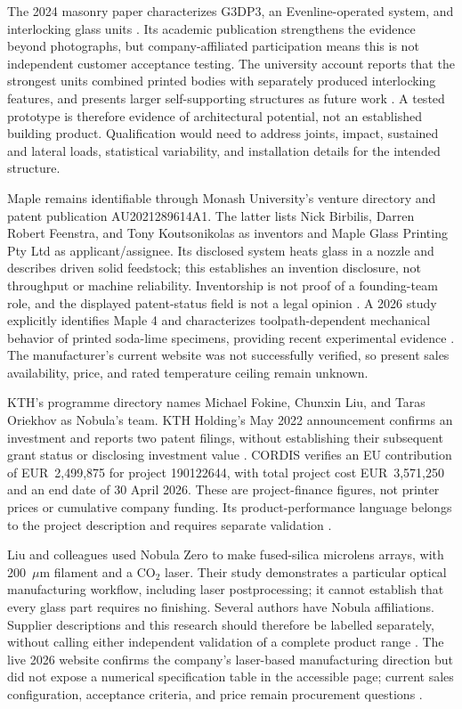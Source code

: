 The 2024 masonry paper characterizes G3DP3, an Evenline-operated system, and interlocking glass units \cite{com_masonry}. Its academic publication strengthens the evidence beyond photographs, but company-affiliated participation means this is not independent customer acceptance testing. The university account reports that the strongest units combined printed bodies with separately produced interlocking features, and presents larger self-supporting structures as future work \cite{com_mitbricks}. A tested prototype is therefore evidence of architectural potential, not an established building product. Qualification would need to address joints, impact, sustained and lateral loads, statistical variability, and installation details for the intended structure.

Maple remains identifiable through Monash University's venture directory and patent publication AU2021289614A1. The latter lists Nick Birbilis, Darren Robert Feenstra, and Tony Koutsonikolas as inventors and Maple Glass Printing Pty Ltd as applicant/assignee. Its disclosed system heats glass in a nozzle and describes driven solid feedstock; this establishes an invention disclosure, not throughput or machine reliability. Inventorship is not proof of a founding-team role, and the displayed patent-status field is not a legal opinion \cite{com_maple,com_maplepatent}. A 2026 study explicitly identifies Maple 4 and characterizes toolpath-dependent mechanical behavior of printed soda-lime specimens, providing recent experimental evidence \cite{acad_chhadeh2026}. The manufacturer's current website was not successfully verified, so present sales availability, price, and rated temperature ceiling remain unknown.

KTH's programme directory names Michael Fokine, Chunxin Liu, and Taras Oriekhov as Nobula's team. KTH Holding's May 2022 announcement confirms an investment and reports two patent filings, without establishing their subsequent grant status or disclosing investment value \cite{com_nobulateam,com_nobulainvest}. CORDIS verifies an EU contribution of EUR~2,499,875 for project 190122644, with total project cost EUR~3,571,250 and an end date of 30 April 2026. These are project-finance figures, not printer prices or cumulative company funding. Its product-performance language belongs to the project description and requires separate validation \cite{com_nobulagrant}.

Liu and colleagues used Nobula Zero to make fused-silica microlens arrays, with 200~$\mu$m filament and a CO$_2$ laser. Their study demonstrates a particular optical manufacturing workflow, including laser postprocessing; it cannot establish that every glass part requires no finishing. Several authors have Nobula affiliations. Supplier descriptions and this research should therefore be labelled separately, without calling either independent validation of a complete product range \cite{com_liu}. The live 2026 website confirms the company's laser-based manufacturing direction but did not expose a numerical specification table in the accessible page; current sales configuration, acceptance criteria, and price remain procurement questions \cite{com_nobula}.

